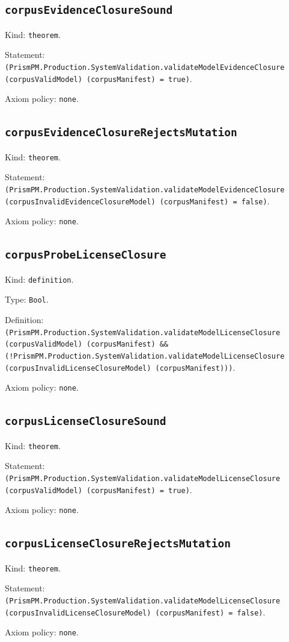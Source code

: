 \documentclass[11pt]{article}
\begin{document}
\subsection*{\texttt{corpusEvidenceClosureSound}}
\noindent Kind: \texttt{theorem}.\par
\noindent Statement: \texttt{(PrismPM.Production.SystemValidation.validateModelEvidenceClosure (corpusValidModel) (corpusManifest) = true)}.\par
\noindent Axiom policy: \texttt{none}.\par
\subsection*{\texttt{corpusEvidenceClosureRejectsMutation}}
\noindent Kind: \texttt{theorem}.\par
\noindent Statement: \texttt{(PrismPM.Production.SystemValidation.validateModelEvidenceClosure (corpusInvalidEvidenceClosureModel) (corpusManifest) = false)}.\par
\noindent Axiom policy: \texttt{none}.\par
\subsection*{\texttt{corpusProbeLicenseClosure}}
\noindent Kind: \texttt{definition}.\par
\noindent Type: \texttt{Bool}.\par
\noindent Definition: \texttt{(PrismPM.Production.SystemValidation.validateModelLicenseClosure (corpusValidModel) (corpusManifest) \&\& (!PrismPM.Production.SystemValidation.validateModelLicenseClosure (corpusInvalidLicenseClosureModel) (corpusManifest)))}.\par
\noindent Axiom policy: \texttt{none}.\par
\subsection*{\texttt{corpusLicenseClosureSound}}
\noindent Kind: \texttt{theorem}.\par
\noindent Statement: \texttt{(PrismPM.Production.SystemValidation.validateModelLicenseClosure (corpusValidModel) (corpusManifest) = true)}.\par
\noindent Axiom policy: \texttt{none}.\par
\subsection*{\texttt{corpusLicenseClosureRejectsMutation}}
\noindent Kind: \texttt{theorem}.\par
\noindent Statement: \texttt{(PrismPM.Production.SystemValidation.validateModelLicenseClosure (corpusInvalidLicenseClosureModel) (corpusManifest) = false)}.\par
\noindent Axiom policy: \texttt{none}.\par
\end{document}
